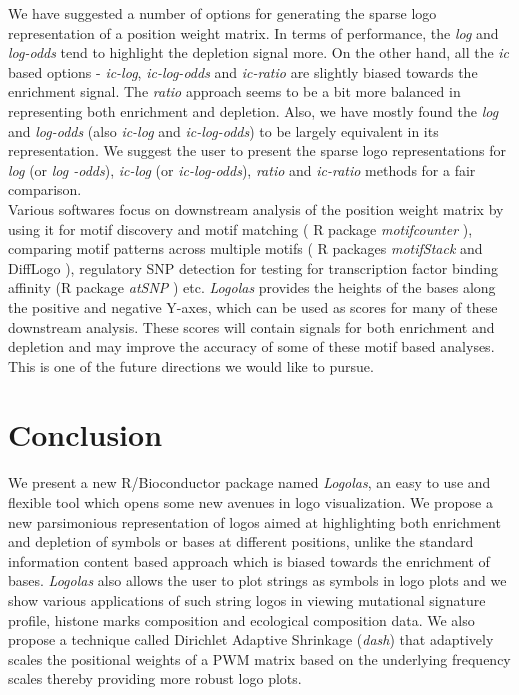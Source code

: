 \documentclass{bmcart}
\begin{document}
We have suggested a number of options for generating the sparse logo representation of a position weight matrix. In terms of performance, the \textit{log} and \textit{log-odds} tend to highlight the depletion signal more. On the other hand, all the \textit{ic} based options - \textit{ic-log}, \textit{ic-log-odds} and \textit{ic-ratio} are slightly biased towards the enrichment signal. The \textit{ratio} approach seems to be a bit more balanced in representing both enrichment and depletion. Also, we have mostly found the \textit{log} and \textit{log-odds} (also \textit{ic-log} and \textit{ic-log-odds}) to be largely equivalent in its representation. We suggest the user to present the sparse logo representations for \textit{log} (or \textit{log -odds}), \textit{ic-log} (or \textit{ic-log-odds}), \textit{ratio} and \textit{ic-ratio} methods for a fair comparison. \\ [3 pt]


Various softwares focus on downstream analysis of the position weight matrix by using it for motif discovery and motif matching ( R package \textit{motifcounter} \cite{Kopp2017} ), comparing motif patterns across multiple motifs ( R packages \textit{motifStack} \cite{Ou2015} and DiffLogo \cite{Nettling2015}), regulatory SNP detection for testing for transcription factor binding affinity (R package \textit{atSNP} \cite{Zuo2015}) etc. \textit{Logolas} provides the heights of the bases along the positive and negative Y-axes, which can be used as scores for many of these downstream analysis. These scores will contain signals for both enrichment and depletion and may improve the accuracy of some of these motif based analyses. This is one of the future directions we would like to pursue. \\ [3 pt]


\section*{Conclusion}

We present a new R/Bioconductor package named \textit{Logolas}, an easy to use and flexible tool which opens some new avenues in logo visualization. We propose a new parsimonious representation of logos aimed at highlighting both enrichment and depletion of symbols or bases at different positions, unlike the standard information content based approach which is biased towards the enrichment of bases. \textit{Logolas} also allows the user to plot strings as symbols in logo plots and we show various applications of such string logos in viewing mutational signature profile, histone marks composition and ecological composition data. We also propose a technique called Dirichlet Adaptive Shrinkage (\textit{dash}) that adaptively scales the positional weights of a PWM matrix based on the underlying frequency scales thereby providing more robust logo plots.  \\ [3 pt]
\end{document}
